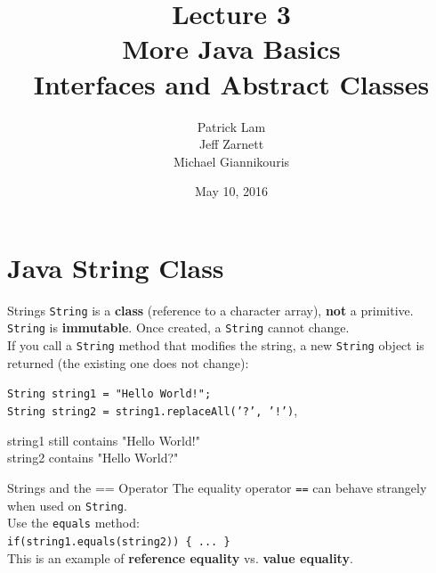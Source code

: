 \documentclass[aspectratio=169]{beamer}
\title{Lecture 3 \\ More Java Basics \\ Interfaces and Abstract Classes}
\date{May 10, 2016}
\author{Patrick Lam \\ Jeff Zarnett \\ Michael Giannikouris}
\institute{Department of Electrical and Computer Engineering}
\begin{document}
\maketitle



\section*{Java String Class}



\begin{frame}{Strings}
\texttt{String} is a \textbf{class} (reference to a character array), \textbf{not} a primitive. \\
\vspace{0.5em}
\texttt{String} is \textbf{immutable}. Once created, a \texttt{String} cannot change. \\
\vspace{0.5em}
If you call a \texttt{String} method that modifies the string, a new \texttt{String} object is returned (the existing one does not change):\\
\vspace{1em}

\texttt{String string1 = "Hello World!";} \\
\texttt{String string2 = string1.replaceAll('?', '!')}, \\
\vspace{1em}

string1 still contains "Hello World!" \\
string2 contains "Hello World?"

\end{frame}



\begin{frame}{Strings and the == Operator}
The equality operator \texttt{==} can behave strangely when used on \texttt{String}. \\
\vspace{1em}
Use the \texttt{equals} method: \\
\texttt{if(string1.equals(string2)) \{ ... \} } \\
\vspace{1em}
This is an example of \textbf{reference equality} vs. \textbf{value equality}.
\end{frame}
\end{document}
